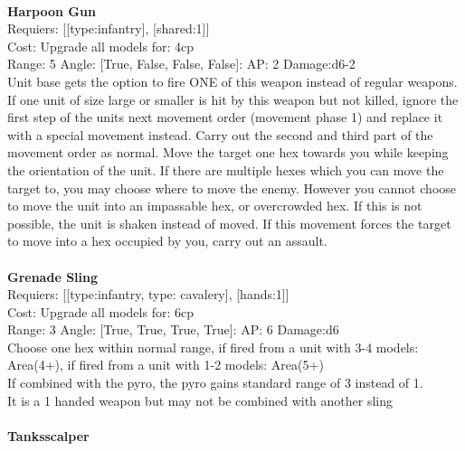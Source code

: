 \ \\
{\bf Harpoon Gun } \\

Requiers: [[type:infantry], [shared:1]] \\
Cost: Upgrade all models for: 4cp \\


Range: 5  Angle: [True, False, False, False]: AP: 2 Damage:d6-2 \\
Unit base gets the option to fire ONE of this weapon instead of regular weapons.\\ 
If one unit of size large or smaller is hit by this weapon but not killed, ignore the first step of the units next movement order (movement phase 1) and replace it with a special movement instead. Carry out the second and third part of the movement order as normal. Move the target one hex towards you while keeping the orientation of the unit. If there are multiple hexes which you can move the target to, you may choose where to move the enemy. However you cannot choose to move the unit into an impassable hex, or overcrowded hex. If this is not possible, the unit is shaken instead of moved. If this movement forces the target to move into a hex occupied by you, carry out an assault.\\ 








\ \\
{\bf Grenade Sling } \\

Requiers: [[type:infantry, type: cavalery], [hands:1]] \\
Cost: Upgrade all models for: 6cp \\


Range: 3  Angle: [True, True, True, True]: AP: 6 Damage:d6 \\
Choose one hex within normal range, if fired from a unit with 3-4 models: Area(4+), if fired from a unit with 1-2 models: Area(5+)\\ 
If combined with the pyro, the pyro gains standard range of 3 instead of 1.\\ 
It is a 1 handed weapon but may not be combined with another sling\\ 








\ \\
{\bf Tanksscalper } \\

